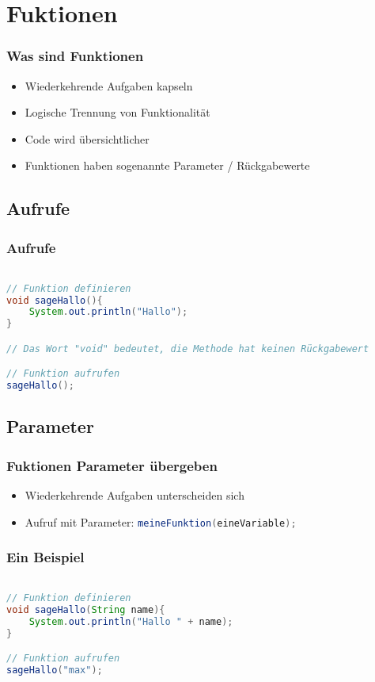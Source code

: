 \documentclass{beamer}
\begin{document}
\section{Fuktionen}
\begin{frame}[fragile]
	\frametitle{Was sind Funktionen}
	\begin{itemize}
		\item Wiederkehrende Aufgaben kapseln
		\item Logische Trennung von Funktionalit\"at
		\item Code wird \"ubersichtlicher
		\item Funktionen haben sogenannte Parameter / R\"uckgabewerte
	\end{itemize}
\end{frame}

\subsection{Aufrufe}
\begin{frame}[fragile]
\frametitle{Aufrufe}
	
	
\begin{lstlisting}[language=java]

// Funktion definieren
void sageHallo(){
	System.out.println("Hallo");	
}

// Das Wort "void" bedeutet, die Methode hat keinen Rückgabewert

// Funktion aufrufen
sageHallo();

	\end{lstlisting}
\end{frame}

\subsection{Parameter}
\begin{frame}[fragile]
	\frametitle{Fuktionen Parameter \"ubergeben}
	\begin{itemize}
		\item Wiederkehrende Aufgaben unterscheiden sich
		\item Aufruf mit Parameter: \lstinline[language=java]{meineFunktion(eineVariable);}
	\end{itemize}
\end{frame}

\begin{frame}[fragile]
	\frametitle{Ein Beispiel}
		
	\begin{lstlisting}[language=java]

// Funktion definieren
void sageHallo(String name){
	System.out.println("Hallo " + name);	
}

// Funktion aufrufen
sageHallo("max");

	\end{lstlisting}
\end{frame}
\end{document}
